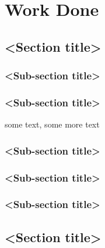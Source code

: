 \chapter{Work Done}

\section{<Section title>}

\subsection{<Sub-section title>}

\subsection{<Sub-section title>}
some text\cite{citation-2-name-here}, some more text
\subsection{<Sub-section title>}

\subsection{<Sub-section title>}



\subsection{<Sub-section title>}


\section{<Section title>}


